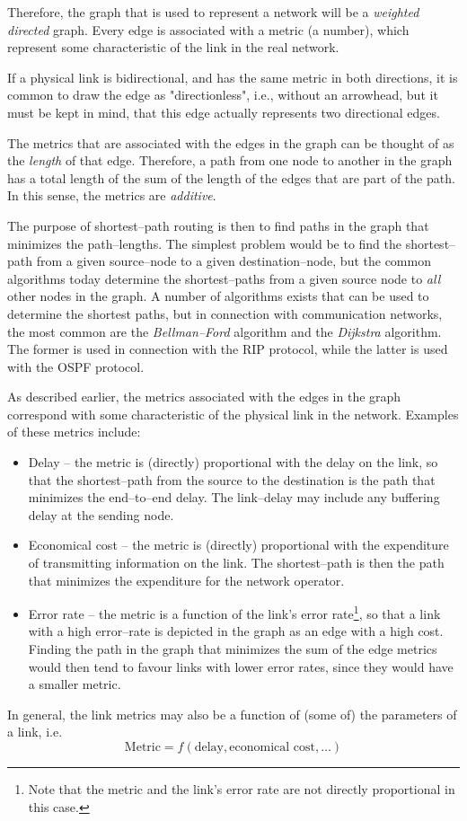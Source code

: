 \documentclass[a4paper]{article}
\newcommand{\ie}{i.e.,\xspace}
\begin{document}
Therefore, the graph that is used to represent a network will be a \emph{weighted directed} graph. Every edge is associated with a metric (a number), which represent some characteristic of the link in the real
network.

If a physical link is bidirectional, and has the same metric in both directions, it is common to draw the edge as "directionless", \ie without an arrowhead, but it must be kept in mind, that this edge actually represents two directional edges.

The metrics that are associated with the edges in the graph can be thought of as the \emph{length} of that edge. Therefore, a path from one node to another in the graph has a total length of the sum of the length of the edges that are part of the path. In this sense, the metrics are \emph{additive}.

The purpose of shortest--path routing is then to find paths in the graph that minimizes the path--lengths. The simplest problem would be to find the shortest--path from a given source--node to a given destination--node, but the common algorithms today determine the shortest--paths from a given source node to \emph{all} other nodes in the graph. A number of algorithms exists that can be used to determine the shortest paths, but in connection with communication networks, the most common are the \emph{Bellman--Ford} algorithm and the
\emph{Dijkstra} algorithm. The former is used in connection with the
RIP protocol, while the latter is used with the OSPF protocol. 

As described earlier, the metrics associated with the edges in the graph correspond with some characteristic of the physical link in the network. Examples of these metrics include:
\begin{itemize}
\item Delay -- the metric is (directly) proportional with the delay on
  the link, so that the shortest--path from the source to the
  destination is the path that minimizes the end--to--end delay. The
  link--delay may include any buffering delay at the sending node.
\item Economical cost -- the metric is (directly) proportional with
  the expenditure of transmitting information on the link. The
  shortest--path is then the path that minimizes the expenditure for
  the network operator.
\item Error rate -- the metric is a function of the link's error
  rate\footnote{Note that the metric and the link's error rate are not
    directly proportional in this case.}, so that a link with a high
  error--rate is depicted in the graph as an edge with a high
  cost. Finding the path in the graph that minimizes the sum of the
  edge metrics would then tend to favour links with lower error rates,
  since they would have a smaller metric.
\end{itemize}
In general, the link metrics may also be a function of (some of) the
parameters of a link, i.e.
\[
\textrm{Metric} = f(\textrm{delay}, \textrm{economical cost}, \ldots)
\]
\end{document}
